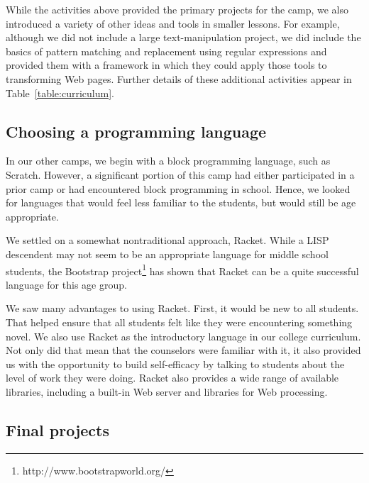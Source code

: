 While the activities above provided the primary projects for the
camp, we also introduced a variety of other ideas and tools in
smaller lessons.  For example, although we did not include a large
text-manipulation project, we did include the basics of pattern
matching and replacement using regular expressions and provided
them with a framework in which they could apply those tools to
transforming Web pages.  Further details of these additional
activities appear in Table~\ref{table:curriculum}.

\subsection{Choosing a programming language}

In our other camps, we begin with a block programming language,
such as Scratch.  However, a significant portion of this camp had
either participated in a prior camp or had encountered block
programming in school.  Hence, we looked for languages that would
feel less familiar to the students, but would still be age appropriate.

We settled on a somewhat nontraditional approach, Racket.  While a
LISP descendent may not seem to be an appropriate language for
middle school students, the Bootstrap
project\footnote{http://www.bootstrapworld.org/} has shown that
Racket can be a quite successful language for this age group.

We saw many advantages to using Racket.  First, it would be new to
all students.  That helped ensure that all students felt like they
were encountering something novel.  We also use Racket as the
introductory language in our college curriculum.  Not only did that
mean that the counselors were familiar with it, it also provided
us with the opportunity to build self-efficacy by talking to students
about the level of work they were doing.  Racket also provides a
wide range of available libraries, including a built-in Web server
and libraries for Web processing.  

\subsection{Final projects}

